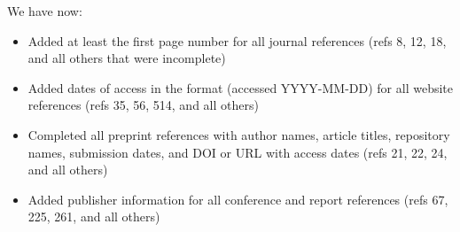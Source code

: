 \begin{reply}
We have now:
\begin{itemize}
\item Added at least the first page number for all journal references (refs 8, 12, 18, and all others that were incomplete)
\item Added dates of access in the format (accessed YYYY-MM-DD) for all website references (refs 35, 56, 514, and all others)
\item Completed all preprint references with author names, article titles, repository names, submission dates, and DOI or URL with access dates (refs 21, 22, 24, and all others)
\item Added publisher information for all conference and report references (refs 67, 225, 261, and all others)
\end{itemize}
\end{reply}


